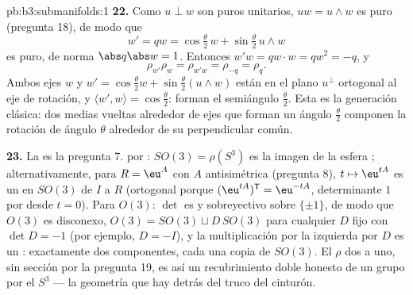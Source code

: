 \begin{solution}{pb:b3:submanifolds:1}
\textbf{22.} Como $u \perp w$ son puros unitarios, $uw =
u\wedge w$ es puro (pregunta 18), de modo que
\[
w' = qw = \cos\tfrac\theta2\,w + \sin\tfrac\theta2\,u\wedge
w
\]
es puro, de norma $\abs q\abs w = 1$. Entonces $w'w = qw\cdot w
= qw^2 = -q$, y
\[
\rho_{w'}\rho_w = \rho_{w'w} = \rho_{-q} = \rho_q .
\]
Ambos ejes $w$ y $w' = \cos\frac\theta2 w +
\sin\frac\theta2(u\wedge w)$ están en el plano $u^\perp$ ortogonal al
eje de rotación, y $\langle w', w\rangle
= \cos\frac\theta2$: forman el semiángulo $\frac\theta2$. Esta es la
generación clásica: dos medias vueltas alrededor de ejes que forman un
ángulo $\frac\theta2$ componen la rotación de ángulo $\theta$ alrededor
de su perpendicular común.

\textbf{23.} La  es la pregunta 7.
 por :
$SO(3) = \rho(S^3)$ es la imagen
 de la esfera
;
alternativamente, para $R = \eu^{A}$ con $A$ antisimétrica (pregunta 8),
$t \mapsto \eu^{tA}$ es un
 en $SO(3)$ de $I$ a $R$
(ortogonal porque $(\eu^{tA})^{\mathsf T} = \eu^{-tA}$, determinante $1$
por  desde $t = 0$).
Para $O(3)$: $\det$ es  y
sobreyectivo sobre $\{\pm1\}$, de modo que $O(3)$ es disconexo,
$O(3) = SO(3)
\sqcup D\,SO(3)$ para cualquier $D$ fijo con $\det D = -1$ (por ejemplo,
$D = -I$), y la multiplicación por la izquierda por $D$ es un
: exactamente dos
componentes, cada una copia de $SO(3)$. El $\rho$ dos a uno, sin sección
por la pregunta 19, es así un recubrimiento doble honesto de un grupo
 por el
 $S^3$ ---
la geometría que hay detrás del truco del cinturón.


\end{solution}
